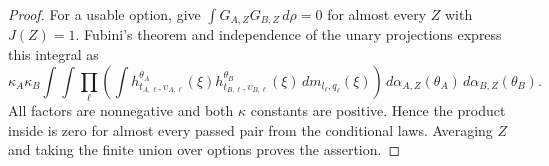 \begin{proof}
For a usable option, 
give $\int G_{A,Z}G_{B,Z}\,d\rho=0$ for almost every $Z$ with $J(Z)=1$.
Fubini's theorem and independence of the unary projections express
this integral as
\[
\kappa_A\kappa_B
\int\!\int
 \prod_\ell\left(
  \int h^{\theta_A}_{t_{A,\ell},\upsilon_{A,\ell}}(\xi)
       h^{\theta_B}_{t_{B,\ell},\upsilon_{B,\ell}}(\xi)
                       \,dm_{l_\ell,q_\ell}(\xi)\right)
 \,d\alpha_{A,Z}(\theta_A)\,d\alpha_{B,Z}(\theta_B).
\]
All factors are nonnegative and both $\kappa$ constants are positive.
Hence the product inside is zero for almost every passed pair from
the conditional laws. Averaging $Z$ and taking the finite union over
options proves the assertion.
\end{proof}
